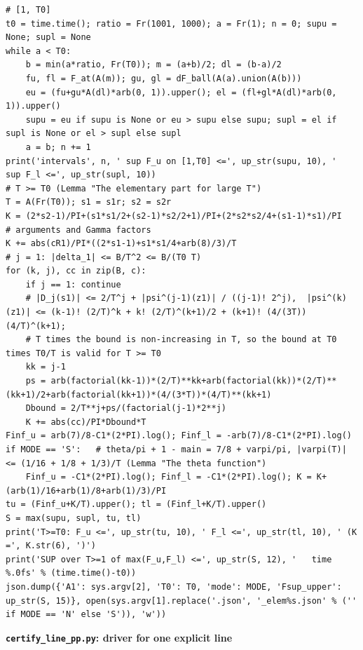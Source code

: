 \documentclass[11pt,reqno]{amsart}
\numberwithin{equation}{section}
\theoremstyle{definition}
\theoremstyle{remark}
\newcommand{\appsub}[1]{\par\medskip\noindent\textbf{#1}\par\nobreak\smallskip}
\begin{document}
\begin{lstlisting}
# [1, T0]
t0 = time.time(); ratio = Fr(1001, 1000); a = Fr(1); n = 0; supu = None; supl = None
while a < T0:
    b = min(a*ratio, Fr(T0)); m = (a+b)/2; dl = (b-a)/2
    fu, fl = F_at(A(m)); gu, gl = dF_ball(A(a).union(A(b)))
    eu = (fu+gu*A(dl)*arb(0, 1)).upper(); el = (fl+gl*A(dl)*arb(0, 1)).upper()
    supu = eu if supu is None or eu > supu else supu; supl = el if supl is None or el > supl else supl
    a = b; n += 1
print('intervals', n, ' sup F_u on [1,T0] <=', up_str(supu, 10), '  sup F_l <=', up_str(supl, 10))
# T >= T0 (Lemma "The elementary part for large T")
T = A(Fr(T0)); s1 = s1r; s2 = s2r
K = (2*s2-1)/PI+(s1*s1/2+(s2-1)*s2/2+1)/PI+(2*s2*s2/4+(s1-1)*s1)/PI        # arguments and Gamma factors
K += abs(cR1)/PI*((2*s1-1)+s1*s1/4+arb(8)/3)/T                             # j = 1: |delta_1| <= B/T^2 <= B/(T0 T)
for (k, j), cc in zip(B, c):
    if j == 1: continue
    # |D_j(s1)| <= 2/T^j + |psi^(j-1)(z1)| / ((j-1)! 2^j),  |psi^(k)(z1)| <= (k-1)! (2/T)^k + k! (2/T)^(k+1)/2 + (k+1)! (4/(3T)) (4/T)^(k+1);
    # T times the bound is non-increasing in T, so the bound at T0 times T0/T is valid for T >= T0
    kk = j-1
    ps = arb(factorial(kk-1))*(2/T)**kk+arb(factorial(kk))*(2/T)**(kk+1)/2+arb(factorial(kk+1))*(4/(3*T))*(4/T)**(kk+1)
    Dbound = 2/T**j+ps/(factorial(j-1)*2**j)
    K += abs(cc)/PI*Dbound*T
Finf_u = arb(7)/8-C1*(2*PI).log(); Finf_l = -arb(7)/8-C1*(2*PI).log()
if MODE == 'S':   # theta/pi + 1 - main = 7/8 + varpi/pi, |varpi(T)| <= (1/16 + 1/8 + 1/3)/T (Lemma "The theta function")
    Finf_u = -C1*(2*PI).log(); Finf_l = -C1*(2*PI).log(); K = K+(arb(1)/16+arb(1)/8+arb(1)/3)/PI
tu = (Finf_u+K/T).upper(); tl = (Finf_l+K/T).upper()
S = max(supu, supl, tu, tl)
print('T>=T0: F_u <=', up_str(tu, 10), ' F_l <=', up_str(tl, 10), ' (K =', K.str(6), ')')
print('SUP over T>=1 of max(F_u,F_l) <=', up_str(S, 12), '   time %.0fs' % (time.time()-t0))
json.dump({'A1': sys.argv[2], 'T0': T0, 'mode': MODE, 'Fsup_upper': up_str(S, 15)}, open(sys.argv[1].replace('.json', '_elem%s.json' % ('' if MODE == 'N' else 'S')), 'w'))
\end{lstlisting}
\appsub{\texttt{certify\_line\_pp.py}: driver for one explicit line}
\label{app:cert_line}
\end{document}
